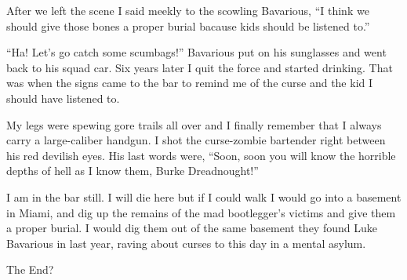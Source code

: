 After we left the scene I said meekly to the scowling Bavarious, ``I
think we should give those bones a proper burial bacause kids
should be listened to.''



``Ha! Let's go catch some scumbags!'' Bavarious put on his sunglasses
and went back to his squad car. Six years later I quit the force
and started drinking. That was when the signs came to the bar to
remind me of the curse and the kid I should have listened to.



My legs were spewing gore trails all over and I finally remember
that I always carry a large-caliber handgun. I shot the
curse-zombie bartender right between his red devilish eyes. His
last words were, ``Soon, soon you will know the horrible depths of
hell as I know them, Burke Dreadnought!''



I am in the bar still. I will die here but if I could walk I would
go into a basement in Miami, and dig up the remains of the mad
bootlegger's victims and give them a proper burial. I would dig
them out of the same basement they found Luke Bavarious in last
year, raving about curses to this day in a mental asylum.



The End?



 



